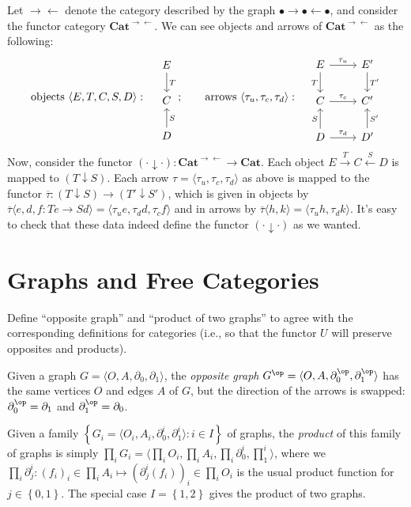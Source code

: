 \begin{solution}
\begin{enumerate}
Let $\rightarrow\leftarrow$ denote the category described by the graph $\bullet\to\bullet\leftarrow\bullet$, and consider the functor category $\mathbf{Cat}^{\rightarrow\leftarrow}$. We can see objects and arrows of $\mathbf{Cat}^{\rightarrow\leftarrow}$ as the following:
\[\text{objects }\langle E,T,C,S,D\rangle:\quad
\begin{tikzcd}E\arrow[d,"T"]\\C\\D\arrow[u,"S",swap]\end{tikzcd};
\qquad\text{arrows }\langle{\tau_u,\tau_c,\tau_d}\rangle:\quad
\begin{tikzcd}E\arrow[d,"T",swap] \arrow[r,"\tau_u"] &E'\arrow[d,"T'"]\\C\arrow[r,"\tau_c"]&C'\\D\arrow[u,"S"]\arrow[r,"\tau_d"]&D'\arrow[u,"S'",swap]\end{tikzcd}\]
Now, consider the functor $(\cdot\downarrow\cdot):\mathbf{Cat}^{\rightarrow\leftarrow}\to\mathbf{Cat}$. Each object $E\overset{T}{\to}C\overset{S}{\leftarrow}D$ is mapped to $(T\downarrow S)$. Each arrow $\tau=\langle \tau_u,\tau_c,\tau_d\rangle$ as above is mapped to the functor $\overline{\tau}:(T\downarrow S)\to(T'\downarrow S')$, which is given in objects by $\overline{\tau}\langle e,d,f:Te\to Sd\rangle=\langle \tau_u e,\tau_d d,\tau_c f\rangle$ and in arrows by $\overline{\tau}\langle h,k\rangle=\langle\tau_uh,\tau_dk\rangle$. It's easy to check that these data indeed define the functor $(\cdot\downarrow\cdot)$ as we wanted.
\end{enumerate}
\end{solution}

\section{Graphs and Free Categories}

\begin{exercise}
Define ``opposite graph'' and ``product of two graphs'' to agree with the corresponding definitions for categories (i.e., so that the functor $U$ will preserve opposites and products).
\end{exercise}
\begin{solution}
Given a graph $G=\langle O,A,\partial_0,\partial_1\rangle$, the \emph{opposite graph} $G^{\op}=\langle O, A,\partial_0^{\op},\partial_1^{\op}\rangle$ has the same vertices $O$ and edges $A$ of $G$, but the direction of the arrows is swapped: $\partial_0^{\op}=\partial_1$ and $\partial_1^{\op}=\partial_0$.

Given a family $\left\{G_i=\langle O_i,A_i,\partial_0^i,\partial_1^i\rangle:i\in I\right\}$ of graphs, the \emph{product} of this family of graphs is simply $\prod_i G_i=\langle \prod_i O_i,\prod_i A_i,\prod_i\partial_0^i,\prod_1^i\rangle$, where we $\prod_i\partial^i_j:(f_i)_{i}\in\prod_i A_i\mapsto (\partial^i_j(f_i))_{i}\in\prod_i O_i$ is the usual product function for $j\in\left\{0,1\right\}$. The special case $I=\left\{1,2\right\}$ gives the product of two graphs.
\end{solution}

